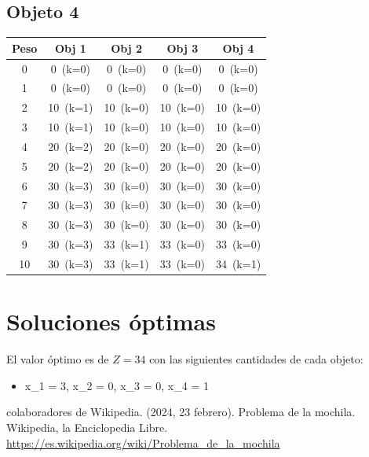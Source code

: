 \documentclass[12pt]{article}
\begin{document}
\subsection*{Objeto 4}
\begin{longtable}{ccccc}
\toprule
Peso & Obj 1 & Obj 2 & Obj 3 & Obj 4 \\
\midrule
0 & \cellcolor{red!20}0~(k=0) & \cellcolor{red!20}0~(k=0) & \cellcolor{red!20}0~(k=0) & \cellcolor{red!20}0~(k=0) \\
1 & \cellcolor{red!20}0~(k=0) & \cellcolor{red!20}0~(k=0) & \cellcolor{red!20}0~(k=0) & \cellcolor{red!20}0~(k=0) \\
2 & \cellcolor{green!40}10~(k=1) & \cellcolor{red!20}10~(k=0) & \cellcolor{red!20}10~(k=0) & \cellcolor{red!20}10~(k=0) \\
3 & \cellcolor{green!40}10~(k=1) & \cellcolor{red!20}10~(k=0) & \cellcolor{red!20}10~(k=0) & \cellcolor{red!20}10~(k=0) \\
4 & \cellcolor{green!40}20~(k=2) & \cellcolor{red!20}20~(k=0) & \cellcolor{red!20}20~(k=0) & \cellcolor{red!20}20~(k=0) \\
5 & \cellcolor{green!40}20~(k=2) & \cellcolor{red!20}20~(k=0) & \cellcolor{red!20}20~(k=0) & \cellcolor{red!20}20~(k=0) \\
6 & \cellcolor{green!40}30~(k=3) & \cellcolor{red!20}30~(k=0) & \cellcolor{red!20}30~(k=0) & \cellcolor{red!20}30~(k=0) \\
7 & \cellcolor{green!40}30~(k=3) & \cellcolor{red!20}30~(k=0) & \cellcolor{red!20}30~(k=0) & \cellcolor{red!20}30~(k=0) \\
8 & \cellcolor{green!40}30~(k=3) & \cellcolor{red!20}30~(k=0) & \cellcolor{red!20}30~(k=0) & \cellcolor{red!20}30~(k=0) \\
9 & \cellcolor{green!40}30~(k=3) & \cellcolor{green!40}33~(k=1) & \cellcolor{red!20}33~(k=0) & \cellcolor{red!20}33~(k=0) \\
10 & \cellcolor{green!40}30~(k=3) & \cellcolor{green!40}33~(k=1) & \cellcolor{red!20}33~(k=0) & \cellcolor{green!40}34~(k=1) \\
\bottomrule
\end{longtable}
\section*{Soluciones óptimas}
El valor óptimo es de $Z = 34$ con las siguientes cantidades de cada objeto:\\
\begin{itemize}
\item x_{1} = 3, x_{2} = 0, x_{3} = 0, x_{4} = 1\\
\end{itemize}
\renewcommand{\refname}{Referencias}
\begin{thebibliography}{9}
 colaboradores de Wikipedia. (2024, 23 febrero). Problema de la mochila. Wikipedia, la Enciclopedia Libre. \\ \url{https://es.wikipedia.org/wiki/Problema_de_la_mochila}
\end{thebibliography}
\end{document}
